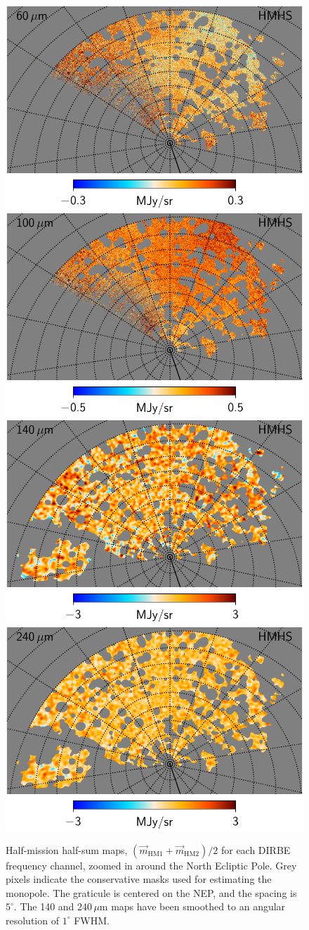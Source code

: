 \documentclass{aa}
\newcommand{\m}[0]{\vec{m}}
\begin{document}
\begin{figure}
  \includegraphics[width=0.38\linewidth]{figs/CGDR2_07_hmhs_fullres.pdf}\hspace*{5mm}
  \includegraphics[width=0.38\linewidth]{figs/CGDR2_08_hmhs_fullres.pdf}\\
  \includegraphics[width=0.38\linewidth]{figs/CGDR2_09_hmhs_fullres_1deg.pdf}\hspace*{5mm}
  \includegraphics[width=0.38\linewidth]{figs/CGDR2_10_hmhs_fullres_1deg.pdf}
  \caption{Half-mission half-sum maps, $(\m_{\mathrm{HM1}}+\m_{\mathrm{HM2}})/2$ for each DIRBE frequency channel, zoomed in around the North Ecliptic Pole. Grey pixels indicate the conservative masks used for estimating the monopole. The graticule is centered on the NEP, and the spacing is $5^{\circ}$. The 140 and 240\,$\mu\mathrm{m}$ maps have been smoothed to an angular resolution of $1^{\circ}$ FWHM.} 
  \label{fig:hmhs_zoom}
\end{figure}
\end{document}
